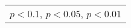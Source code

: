 \begin{tabular}{l|cccccc|cc}
\multicolumn{9}{l}{\tiny \sym{*} \(p<0.1\), \sym{**} \(p<0.05\), \sym{***} \(p<0.01\)}\\
\end{tabular}